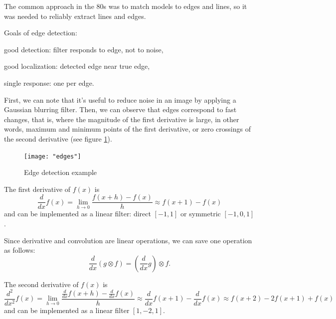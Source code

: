 The common approach in the 80s was to match models to edges and lines, so it was needed to reliably extract lines and edges.

Goals of edge detection:\label{edge-goals}
\begin{myitem}
    \item good detection: filter responds to edge, not to noise,
    \item good localization: detected edge near true edge,
    \item single response: one per edge.
\end{myitem}

First, we can note that it's useful to reduce noise in an image by applying a Gaussian blurring filter. Then, we can observe that edges correspond to fast changes, that is, where the magnitude of the first derivative is large, in other words, maximum and minimum points of the first derivative, or zero crossings of the second derivative (see figure \ref{fig:edges}).

\begin{figure}[!h]
    \centering
    \texttt{[image: "edges"]}
    \caption[Edge detection example]{Edge detection example}
    \label{fig:edges}
\end{figure}

The first derivative of $f(x)$ is
\begin{equation}\label{eq:gauss-dx}
    \frac{d}{dx} f(x) = \lim_{h \to 0} \frac{f(x+h) - f(x)}{h} \approx f(x+1) - f(x)
\end{equation}
and can be implemented as a linear filter: direct $[-1, 1]$ or symmetric $[-1, 0, 1]$.

Since derivative and convolution are linear operations, we can save one operation as follows:
\begin{equation}\label{eq:gauss-dx-g}
    \frac{d}{dx} (g \otimes f) = \left( \frac{d}{dx} g \right) \otimes f.
\end{equation}

The second derivative of $f(x)$ is
\begin{equation}\label{eq:gauss-dx2}
    \frac{d^2}{dx^2} f(x)
    = \lim_{h \to 0} \frac{\frac{d}{dx} f(x+h) - \frac{d}{dx} f(x)}{h}
    \approx \frac{d}{dx} f(x+1) - \frac{d}{dx} f(x)
    \approx f(x+2) -2 f(x+1) + f(x)
\end{equation}
and can be implemented as a linear filter $[1, -2, 1]$.

